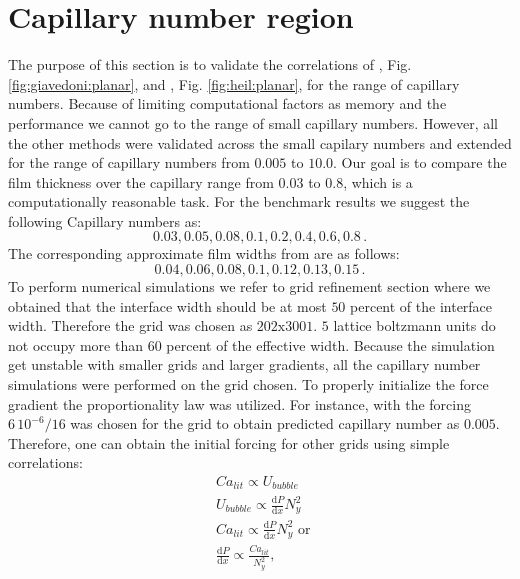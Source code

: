 \documentclass{article}
\begin{document}
\section{Capillary number region}
The purpose of this section is to validate the correlations of
\citet{giavedoni-numerical}, Fig. \ref{fig:giavedoni:planar}, and
\citet{heil-bretherton}, Fig. \ref{fig:heil:planar}, for the range of capillary
numbers. Because of limiting computational factors as memory and the
performance we cannot go to the range of small
capillary numbers. However, all the other methods were validated across the
small capilary numbers and extended for the range of capillary numbers from
$0.005$ to $10.0$. Our goal is to compare the film thickness over the capillary
range from $0.03$ to $0.8$, which is a computationally reasonable task.  For the
benchmark
results we
suggest the following Capillary numbers as:
\begin{equation}
0.03,0.05,0.08,0.1,0.2,0.4,0.6,0.8\, .
\end{equation}
The corresponding approximate film widths from \cite{giavedoni-numerical} are as
follows:
\begin{equation}
0.04,0.06,0.08,0.1,0.12,0.13,0.15\,.
\end{equation}
To perform numerical simulations we refer
to
grid refinement section where we obtained that the interface width should be
at most $50$ percent of the interface width. Therefore the grid was chosen as
$202 \mathrm{x} 3001$. $5$ lattice boltzmann units do not occupy more than $60$
percent of the effective width. Because the simulation get unstable with
smaller grids and larger gradients, all the capillary number simulations were
performed on the grid chosen. To properly initialize the force gradient the
proportionality law was utilized. For instance, with the forcing
$6\,10^{-6}/16$ was chosen for the grid to obtain predicted capillary number as
$0.005$. Therefore, one can obtain the initial forcing for other grids using
simple correlations: 
\begin{equation}
\begin{aligned}
&Ca_{lit} \propto U_{bubble}\\
&U_{bubble} \propto \frac{\mathrm{d}P}{\mathrm{d}x} N_y^2\\ 
&Ca_{lit} \propto \frac{\mathrm{d}P}{\mathrm{d} x} N_y^2 \text{ or }\\
&\frac{\mathrm{d}P}{\mathrm{d} x} \propto \frac{Ca_{lit}}{N_y^2},
\end{aligned}
\end{equation}
\end{document}
